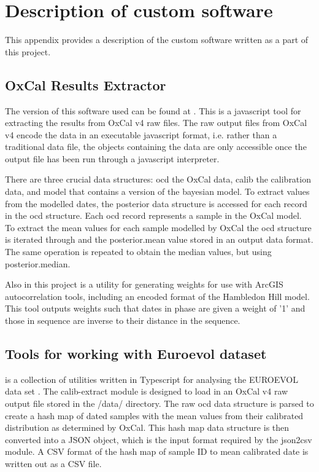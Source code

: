 \chapter{Description of custom software}
This appendix provides a description of the custom software written as a part of this project.

\section{OxCal Results Extractor}
The version of this software used can be found at \citet{doug_cowie_2019_2555393}. This is a javascript tool for extracting the results from OxCal v4 raw files. The raw output files from OxCal v4 encode the data in an executable javascript format, i.e. rather than a traditional data file, the objects containing the data are only accessible once the output file has been run through a javascript interpreter.

There are three crucial data structures: ocd the OxCal data, calib the calibration data, and model that contains a version of the bayesian model. To extract values from the modelled dates, the posterior data structure is accessed for each record in the ocd structure. Each ocd record represents a sample in the OxCal model. To extract the mean values for each sample modelled by OxCal the ocd structure is iterated through and the posterior.mean value stored in an output data format. The same operation is repeated to obtain the median values, but using posterior.median.

Also in this project is a utility for generating weights for use with ArcGIS autocorrelation tools, including an encoded format of the Hambledon Hill model. This tool outputs weights such that dates in phase are given a weight of '1' and those in sequence are inverse to their distance in the sequence.

\section{Tools for working with Euroevol dataset}
\citet{doug_cowie_2018_1297321} is a collection of utilities written in Typescript for analysing the EUROEVOL data set \citep{Manning:2016fk}. The calib-extract module is designed to load in an OxCal v4 raw output file stored in the /data/ directory. The raw ocd data structure is parsed to create a hash map of dated samples with the mean values from their calibrated distribution as determined by OxCal. This hash map data structure is then converted into a JSON object, which is the input format required by the json2csv module. A CSV format of the hash map of sample ID to mean calibrated date is written out as a CSV file.

